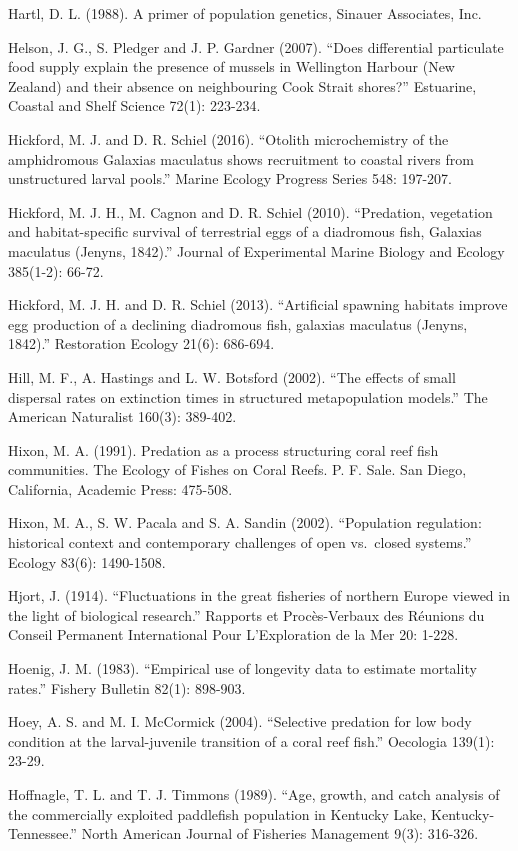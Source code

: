 \documentclass[]{book}
\begin{document}
Hartl, D. L. (1988). A primer of population genetics, Sinauer
Associates, Inc.

Helson, J. G., S. Pledger and J. P. Gardner (2007). ``Does differential
particulate food supply explain the presence of mussels in Wellington
Harbour (New Zealand) and their absence on neighbouring Cook Strait
shores?'' Estuarine, Coastal and Shelf Science 72(1): 223-234.

Hickford, M. J. and D. R. Schiel (2016). ``Otolith microchemistry of the
amphidromous Galaxias maculatus shows recruitment to coastal rivers from
unstructured larval pools.'' Marine Ecology Progress Series 548:
197-207.

Hickford, M. J. H., M. Cagnon and D. R. Schiel (2010). ``Predation,
vegetation and habitat-specific survival of terrestrial eggs of a
diadromous fish, Galaxias maculatus (Jenyns, 1842).'' Journal of
Experimental Marine Biology and Ecology 385(1-2): 66-72.

Hickford, M. J. H. and D. R. Schiel (2013). ``Artificial spawning
habitats improve egg production of a declining diadromous fish, galaxias
maculatus (Jenyns, 1842).'' Restoration Ecology 21(6): 686-694.

Hill, M. F., A. Hastings and L. W. Botsford (2002). ``The effects of
small dispersal rates on extinction times in structured metapopulation
models.'' The American Naturalist 160(3): 389-402.

Hixon, M. A. (1991). Predation as a process structuring coral reef fish
communities. The Ecology of Fishes on Coral Reefs. P. F. Sale. San
Diego, California, Academic Press: 475-508.

Hixon, M. A., S. W. Pacala and S. A. Sandin (2002). ``Population
regulation: historical context and contemporary challenges of open
vs.~closed systems.'' Ecology 83(6): 1490-1508.

Hjort, J. (1914). ``Fluctuations in the great fisheries of northern
Europe viewed in the light of biological research.'' Rapports et
Procès-Verbaux des Réunions du Conseil Permanent International Pour
L'Exploration de la Mer 20: 1-228.

Hoenig, J. M. (1983). ``Empirical use of longevity data to estimate
mortality rates.'' Fishery Bulletin 82(1): 898-903.

Hoey, A. S. and M. I. McCormick (2004). ``Selective predation for low
body condition at the larval-juvenile transition of a coral reef fish.''
Oecologia 139(1): 23-29.

Hoffnagle, T. L. and T. J. Timmons (1989). ``Age, growth, and catch
analysis of the commercially exploited paddlefish population in Kentucky
Lake, Kentucky-Tennessee.'' North American Journal of Fisheries
Management 9(3): 316-326.
\end{document}
